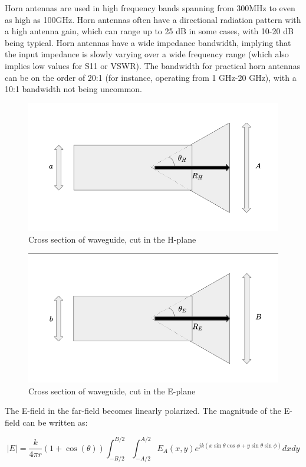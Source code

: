 \documentclass[a4paper,12pt]{report}
\begin{document}
Horn antennas are used in high frequency bands spanning from 300MHz
to even as high as 100GHz.
Horn antennas often have a directional radiation pattern with a high antenna gain,
which can range up to 25 dB in some cases, with 10-20 dB being typical.
Horn antennas have a wide impedance bandwidth,
implying that the input impedance is slowly varying over a wide frequency range (which also implies low values for S11 or VSWR). The bandwidth for practical horn antennas can be on the order of 20:1 (for instance, operating from 1 GHz-20 GHz),
with a 10:1 bandwidth not being uncommon.

\begin{figure}
  \begin{center}
    \includegraphics[clip, keepaspectratio, width=0.5\linewidth]{img/horn_antenna_h_plane_cross_section.png}
    \caption{Cross section of waveguide, cut in the H-plane}
    \label{fig:horn_antenna_h_plane_cross_section}
  \end{center}
\end{figure}

\begin{figure}
  \begin{center}
    \includegraphics[clip, keepaspectratio, width=0.5\linewidth]{img/horn_antenna_e_plane_cross_section.png}
    \caption{Cross section of waveguide, cut in the E-plane}
    \label{fig:horn_antenna_e_plane_cross_section}
  \end{center}
\end{figure}

The E-field in the far-field becomes linearly polarized.
The magnitude of the E-field can be written as:

\begin{equation}
  |E| = \frac{k}{4 \pi r}(1 + \cos(\theta))\int_{-B/2}^{B/2}\int_{-A/2}^{A/2}E_A(x,y)e^{jk(x\sin\theta\cos\phi + y\sin\theta\sin\phi)}dxdy
\end{equation}
\end{document}
